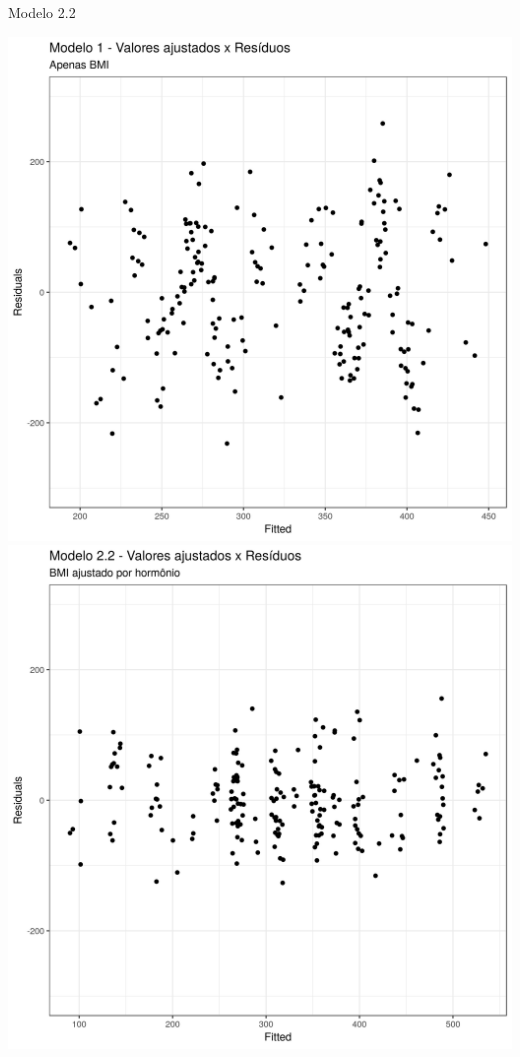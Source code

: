 \documentclass{beamer}
\begin{document}

\begin{frame}{\small Modelo 2.2}
  \begin{center}
    \includegraphics[height=.6\textheight]{Cap31-32/pratica-rlm1-resid}
    \includegraphics[height=.6\textheight]{Cap31-32/pratica-rlm2_2-resid}
  \end{center}
\end{frame}
\end{document}
